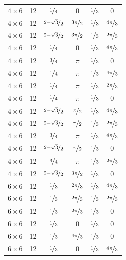 \documentclass{article}
\begin{document}
\begin{longtable}{cccccc}
$4 \times 6$ & 12 & $\nicefrac{1}{4}$ & 0 & $\nicefrac{1}{3}$ & 0 \\
$4 \times 6$ & 12 & $\nicefrac{2-\sqrt{3}}{2}$ & $\nicefrac{3\pi}{2}$ & $\nicefrac{1}{3}$ & $\nicefrac{4\pi}{3}$ \\
$4 \times 6$ & 12 & $\nicefrac{2-\sqrt{3}}{2}$ & $\nicefrac{3\pi}{2}$ & $\nicefrac{1}{3}$ & $\nicefrac{2\pi}{3}$ \\
$4 \times 6$ & 12 & $\nicefrac{1}{4}$ & 0 & $\nicefrac{1}{3}$ & $\nicefrac{4\pi}{3}$ \\
$4 \times 6$ & 12 & $\nicefrac{3}{4}$ & $\pi$ & $\nicefrac{1}{3}$ & 0 \\
$4 \times 6$ & 12 & $\nicefrac{1}{4}$ & $\pi$ & $\nicefrac{1}{3}$ & $\nicefrac{4\pi}{3}$ \\
$4 \times 6$ & 12 & $\nicefrac{1}{4}$ & $\pi$ & $\nicefrac{1}{3}$ & $\nicefrac{2\pi}{3}$ \\
$4 \times 6$ & 12 & $\nicefrac{1}{4}$ & $\pi$ & $\nicefrac{1}{3}$ & 0 \\
$4 \times 6$ & 12 & $\nicefrac{2-\sqrt{3}}{2}$ & $\nicefrac{\pi}{2}$ & $\nicefrac{1}{3}$ & $\nicefrac{4\pi}{3}$ \\
$4 \times 6$ & 12 & $\nicefrac{2-\sqrt{3}}{2}$ & $\nicefrac{\pi}{2}$ & $\nicefrac{1}{3}$ & $\nicefrac{2\pi}{3}$ \\
$4 \times 6$ & 12 & $\nicefrac{3}{4}$ & $\pi$ & $\nicefrac{1}{3}$ & $\nicefrac{4\pi}{3}$ \\
$4 \times 6$ & 12 & $\nicefrac{2-\sqrt{3}}{2}$ & $\nicefrac{\pi}{2}$ & $\nicefrac{1}{3}$ & 0 \\
$4 \times 6$ & 12 & $\nicefrac{3}{4}$ & $\pi$ & $\nicefrac{1}{3}$ & $\nicefrac{2\pi}{3}$ \\
$4 \times 6$ & 12 & $\nicefrac{2-\sqrt{3}}{2}$ & $\nicefrac{3\pi}{2}$ & $\nicefrac{1}{3}$ & 0 \\
$6 \times 6$ & 12 & $\nicefrac{1}{3}$ & $\nicefrac{2\pi}{3}$ & $\nicefrac{1}{3}$ & $\nicefrac{4\pi}{3}$ \\
$6 \times 6$ & 12 & $\nicefrac{1}{3}$ & $\nicefrac{2\pi}{3}$ & $\nicefrac{1}{3}$ & $\nicefrac{2\pi}{3}$ \\
$6 \times 6$ & 12 & $\nicefrac{1}{3}$ & $\nicefrac{2\pi}{3}$ & $\nicefrac{1}{3}$ & 0 \\
$6 \times 6$ & 12 & $\nicefrac{1}{3}$ & 0 & $\nicefrac{1}{3}$ & 0 \\
$6 \times 6$ & 12 & $\nicefrac{1}{3}$ & $\nicefrac{4\pi}{3}$ & $\nicefrac{1}{3}$ & 0 \\
$6 \times 6$ & 12 & $\nicefrac{1}{3}$ & 0 & $\nicefrac{1}{3}$ & $\nicefrac{4\pi}{3}$ \\

\end{longtable}
\end{document}
